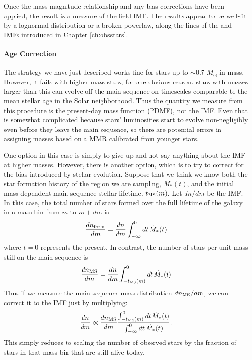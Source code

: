 Once the mass-magnitude relationship and any bias corrections have been applied, the result is a measure of the field IMF. The results appear to be well-fit by a lognormal distribution or a broken powerlaw, along the lines of the \citet{chabrier05a} and \citet{kroupa02c} IMFs introduced in Chapter \ref{ch:obsstars}.

\paragraph{Age Correction}

The strategy we have just described works fine for stars up to $\sim 0.7$ $M_\odot$ in mass. However, it fails with higher mass stars, for one obvious reason: stars with masses larger than this can evolve off the main sequence on timescales comparable to the mean stellar age in the Solar neighborhood. Thus the quantity we measure from this procedure is the present-day mass function (PDMF), not the IMF. Even that is somewhat complicated because stars' luminosities start to evolve non-negligibly even before they leave the main sequence, so there are potential errors in assigning masses based on a MMR calibrated from younger stars.

One option in this case is simply to give up and not say anything about the IMF at higher masses. However, there is another option, which is to try to correct for the bias introduced by stellar evolution. Suppose that we think we know both the star formation history of the region we are sampling, $\dot{M}_*(t)$, and the initial mass-dependent main-sequence stellar lifetime, $t_{\rm MS}(m)$. Let $dn/dm$ be the IMF. In this case, the total number of stars formed over the full lifetime of the galaxy in a mass bin from $m$ to $m+dm$ is
\begin{equation}
\frac{dn_{\rm form}}{dm} =  \frac{dn}{dm} \int_{-\infty}^0 dt \, \dot{M}_*(t)
\end{equation}
where $t=0$ represents the present. In contrast, the number of stars per unit mass still on the main sequence is
\begin{equation}
\frac{dn_{\rm MS}}{dm} = \frac{dn}{dm} \int_{-t_{\rm MS}(m)}^0 dt \, \dot{M}_*(t)
\end{equation}
Thus if we measure the main sequence mass distribution $dn_{\rm MS}/dm$, we can correct it to the IMF just by multiplying:
\begin{equation}
\frac{dn}{dm} \propto \frac{dn_{\rm MS}}{dm} \frac{\int_{-t_{\rm MS}(m)}^0 dt \, \dot{M}_*(t)}{\int_{-\infty}^0 dt \, \dot{M}_*(t)}.
\end{equation}
This simply reduces to scaling the number of observed stars by the fraction of stars in that mass bin that are still alive today.


